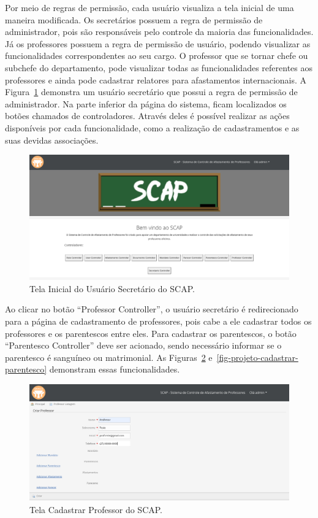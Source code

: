 Por meio de regras de permissão, cada usuário visualiza a tela inicial de uma maneira modificada. Os secretários possuem a regra de permissão de administrador, pois são responsáveis pelo controle da maioria das funcionalidades. Já os professores possuem a regra de permissão de usuário, podendo visualizar as funcionalidades correspondentes ao seu cargo. O professor que se tornar chefe ou subchefe do departamento, pode visualizar todas as funcionalidades referentes aos professores e ainda pode cadastrar relatores para afastamentos internacionais. A Figura~\ref{fig-projeto-usuario-secretario} demonstra um usuário secretário que possui a regra de permissão de administrador. Na parte inferior da página do sistema, ficam localizados os botões chamados de controladores. Através deles é possível realizar as ações disponíveis por cada funcionalidade, como a realização de cadastramentos e as suas devidas associações. 

\begin{figure}[!h]
	\centering
	\includegraphics[scale=0.33]{figuras/fig-projeto-usuario-secretario} 
	\caption{Tela Inicial do Usuário Secretário do SCAP.}
	\label{fig-projeto-usuario-secretario}
\end{figure}

Ao clicar no botão ``Professor Controller'', o usuário secretário é redirecionado para a página de cadastramento de professores, pois cabe a ele cadastrar todos os professores e os parentescos entre eles. Para cadastrar os parentescos, o botão ``Parentesco Controller'' deve ser acionado, sendo necessário informar se o parentesco é sanguíneo ou matrimonial. As Figuras~\ref{fig-projeto-cadastrar-professor} e~\ref{fig-projeto-cadastrar-parentesco} demonstram essas funcionalidades.

\begin{figure}[!h]
	\centering
	\includegraphics[scale=0.33]{figuras/fig-projeto-cadastrar-professor} 
	\caption{Tela Cadastrar Professor do SCAP.}
	\label{fig-projeto-cadastrar-professor}
\end{figure}

